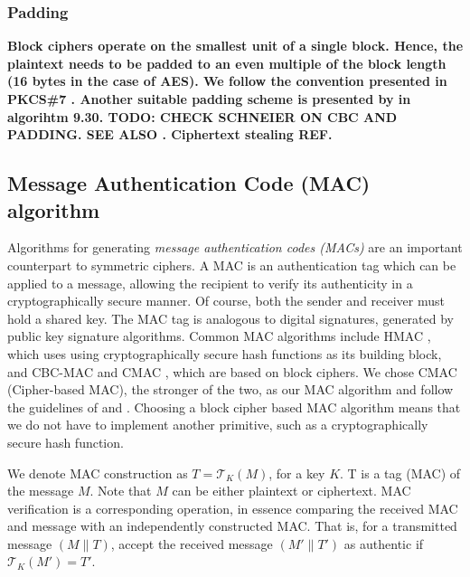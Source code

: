 
\subsubsection{Padding}

\textbf{Block ciphers operate on the smallest unit of a single block. Hence, the plaintext needs to be padded to an even multiple of the block length (16 bytes in the case of AES). We follow the convention presented in PKCS\#7 \cite{RFC-2315-kaliski-1998}. Another suitable padding scheme is presented by  in algorihtm 9.30. \textbf{TODO: CHECK SCHNEIER ON CBC AND PADDING.} \textbf{SEE ALSO \cite[Appendix A]{dworkin2001}.} \textbf{Ciphertext stealing REF. \cite{dworkin2010}}}

\subsection{Message Authentication Code (MAC) algorithm}

Algorithms for generating \textit{message authentication codes (MACs)} are an important counterpart to symmetric ciphers. A MAC is an authentication tag which can be applied to a message, allowing the recipient to verify its authenticity in a cryptographically secure manner. Of course, both the sender and receiver must hold a shared key. The MAC tag is analogous to digital signatures, generated by public key signature algorithms. Common MAC algorithms include HMAC , which uses using cryptographically secure hash functions as its building block, and CBC-MAC  and CMAC , which are based on block ciphers. We chose CMAC (Cipher-based MAC), the stronger of the two, as our MAC algorithm and follow the guidelines of  and . Choosing a block cipher based MAC algorithm means that we do not have to implement another primitive, such as a cryptographically secure hash function.

We denote MAC construction as $T=\mathcal{T}_K(M)$, for a key $K$. T is a tag (MAC) of the message $M$. Note that $M$ can be either plaintext or ciphertext.
MAC verification is a corresponding operation, in essence comparing the received MAC and message with an independently constructed MAC. That is, for a transmitted message $(M \parallel T)$, accept the received message $(M' \parallel T')$ as authentic if $\mathcal{T}_K(M') = T'$.

